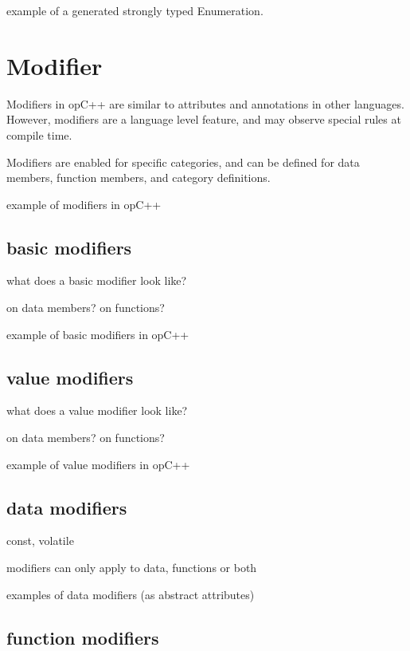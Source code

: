 example of a generated strongly typed Enumeration.

\section{ Modifier }
\label{sec:concepts_modifier}

Modifiers in opC++ are similar to attributes and annotations in other languages.  However,
modifiers are a language level feature, and may observe special rules at compile time.

Modifiers are enabled for specific categories, and can be defined for data members, function
members, and category definitions.

example of modifiers in opC++

\subsection{ basic modifiers }
\label{sec:concepts_basic_modifiers}

what does a basic modifier look like?

on data members? on functions?

example of basic modifiers in opC++

\subsection{ value modifiers }
\label{sec:concepts_value_modifiers}

what does a value modifier look like?

on data members? on functions?

example of value modifiers in opC++


\subsection{ data modifiers }
\label{sec:concepts_data_modifiers}

const, volatile

modifiers can only apply to data, functions or both

examples of data modifiers (as abstract attributes)

\subsection{ function modifiers }
\label{sec:concepts_function_modifiers}

